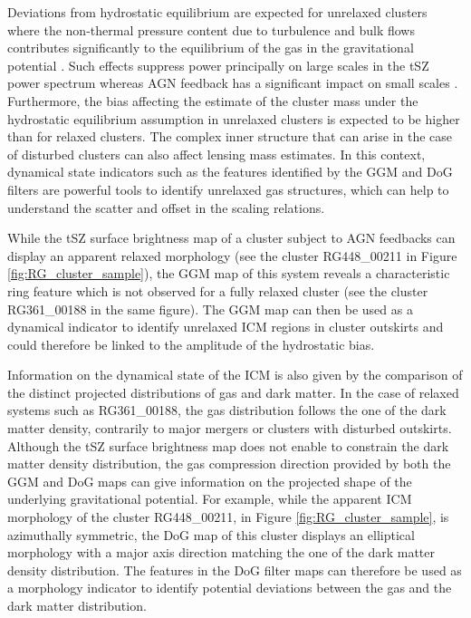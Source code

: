 \documentclass[twocolumn,traditabstract]{aa}
\begin{document}
Deviations from hydrostatic equilibrium are expected for unrelaxed clusters where the non-thermal pressure content due to turbulence and bulk flows contributes significantly to the equilibrium of the gas in the gravitational potential \citep[e.g.][]{Siegel2016}. Such effects suppress power principally on large scales in the tSZ power spectrum whereas AGN feedback has a significant impact on small scales \citep[e.g.][]{Shaw2010}. Furthermore, the bias affecting the estimate of the cluster mass under the hydrostatic equilibrium assumption in unrelaxed clusters is expected to be higher than for relaxed clusters. The complex inner structure that can arise in the case of disturbed clusters can also affect lensing mass estimates. In this context, dynamical state indicators such as the features identified by the GGM and DoG filters are powerful tools to identify unrelaxed gas structures, which can help to understand the scatter and offset in the scaling relations.

While the tSZ surface brightness map of a cluster subject to AGN feedbacks can display an apparent relaxed morphology (see the cluster RG448\_00211 in Figure \ref{fig:RG_cluster_sample}), the GGM map of this system reveals a characteristic ring feature which is not observed for a fully relaxed cluster (see the cluster RG361\_00188 in the same figure). The GGM map can then be used as a dynamical indicator to identify unrelaxed ICM regions in cluster outskirts and could therefore be linked to the amplitude of the hydrostatic bias.

Information on the dynamical state of the ICM is also given by the comparison of the distinct projected distributions of gas and dark matter. In the case of relaxed systems such as RG361\_00188, the gas distribution follows the one of the dark matter density, contrarily to major mergers or clusters with disturbed outskirts. Although the tSZ surface brightness map does not enable to constrain the dark matter density distribution, the gas compression direction provided by both the GGM and DoG maps can give information on the projected shape of the underlying gravitational potential. For example, while the apparent ICM morphology of the cluster RG448\_00211, in Figure \ref{fig:RG_cluster_sample}, is azimuthally symmetric, the DoG map of this cluster displays an elliptical morphology with a major axis direction matching the one of the dark matter density distribution. The features in the DoG filter maps can therefore be used as a morphology indicator to identify potential deviations between the gas and the dark matter distribution.
\end{document}
